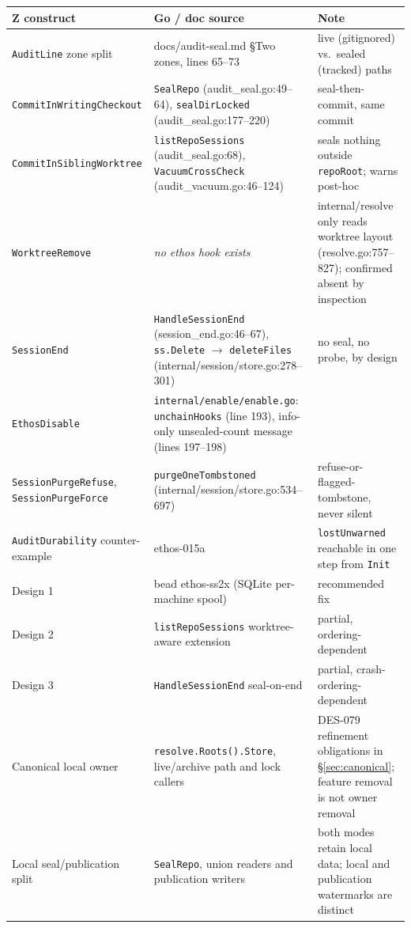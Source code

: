 \documentclass[a4paper,10pt,fleqn]{article}
\newcommand{\fpath}[1]{\nolinkurl{#1}}
\newcommand{\field}[1]{\ifmmode\texttt{#1}\else\texorpdfstring{\breakfield{#1}}{#1}\fi}
\begin{document}
\begin{longtable}{@{}>{\raggedright\arraybackslash}p{}>{\raggedright\arraybackslash}p{}>{\raggedright\arraybackslash}p{}@{}}
\toprule
\textbf{Z construct} & \textbf{Go / doc source} & \textbf{Note} \\
\midrule
\endhead
\bottomrule
\endfoot
\field{AuditLine} zone split &
  docs/audit-seal.md \S Two zones, lines 65--73 &
  live (gitignored) vs.\ sealed (tracked) paths \\
\field{CommitInWritingCheckout} & \field{SealRepo}
  (audit\_seal.go:49--64), \field{sealDirLocked}
  (audit\_seal.go:177--220) & seal-then-commit, same commit \\
\field{CommitInSiblingWorktree} & \field{listRepoSessions}
  (audit\_seal.go:68), \field{VacuumCrossCheck}
  (audit\_vacuum.go:46--124) & seals nothing outside \field{repoRoot};
  warns post-hoc \\
\field{WorktreeRemove} & \emph{no ethos hook exists} &
  internal/resolve only reads worktree layout
  (resolve.go:757--827); confirmed absent by inspection \\
\field{SessionEnd} & \field{HandleSessionEnd}
  (session\_end.go:46--67), \field{ss.Delete} $\to$ \field{deleteFiles}
  (internal/session/store.go:278--301) & no seal, no probe, by design \\
\field{EthosDisable} & \fpath{internal/enable/enable.go}: \field{unchainHooks}
  (line 193), info-only unsealed-count message (lines 197--198) & \\
\field{SessionPurgeRefuse}, \field{SessionPurgeForce} &
  \field{purgeOneTombstoned} (internal/session/store.go:534--697) &
  refuse-or-flagged-tombstone, never silent \\
\field{AuditDurability} counter-example &
  ethos-015a & \field{lostUnwarned} reachable in one step from
  \field{Init} \\
Design 1 & bead ethos-ss2x (SQLite per-machine spool) & recommended fix \\
Design 2 & \field{listRepoSessions} worktree-aware extension &
  partial, ordering-dependent \\
Design 3 & \field{HandleSessionEnd} seal-on-end &
  partial, crash-ordering-dependent \\
Canonical local owner & \field{resolve.Roots().Store}, live/archive
  path and lock callers & DES-079 refinement obligations in
  \S\ref{sec:canonical}; feature removal is not owner removal \\
Local seal/publication split & \field{SealRepo}, union readers and
  publication writers & both modes retain local data; local and
  publication watermarks are distinct \\
\end{longtable}
\end{document}
